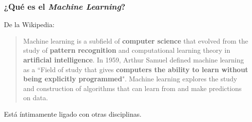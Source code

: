 \documentclass{beamer}
\begin{document}
%
%

\begin{frame}
\frametitle{¿Qué es el \textit{Machine Learning}?}

De la Wikipedia:
\begin{quote}
Machine learning is a subfield of \textbf{computer science} that evolved from the study of \textbf{pattern recognition} and computational learning theory in \textbf{artificial intelligence}.
In 1959, Arthur Samuel defined machine learning as a ``Field of study that gives \textbf{computers the ability to learn without being explicitly programmed}". Machine learning explores the study and construction of algorithms that can learn from and make predictions on data.
\end{quote}

Está íntimamente ligado con otras disciplinas.
\end{frame}
\end{document}

